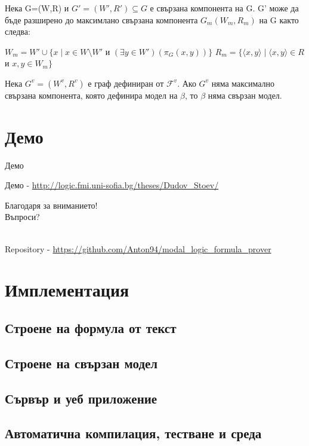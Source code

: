 \documentclass[14pt, aspectratio=169]{beamer}
\newcommand\F{\mathcal{F}}
\newcommand{\pair}[2]{ \langle #1, #2 \rangle }
\newcommand{\pairXY}{ \pair{x}{y} }
\begin{document}
\begin{frame}
	\begin{lemma}
		Нека G=(W,R) и $G'=(W', R') \subseteq G$ е свързана компонента на G.
		G' може да бъде разширено до максимлано свързана компонента $G_m(W_m, R_m)$  на G  както следва:
		\begin{center}
			 $W_m = W' \cup \{ x \mid x \in W \setminus W'$ и $(\exists y \in W')(\pi_G(x,y)) \}$
			 $R_m = \{ \pairXY \mid \pairXY \in R$ и $x, y \in W_m \}$
		\end{center}
	\end{lemma}

	\begin{theorem}
		Нека $G^v=(W^v, R^v)$ е граф дефиниран от $\F^v$. Ако $G^v$ няма максимално свързана компонента, която дефинира модел на $\beta$, то $\beta$ няма свързан модел.
	\end{theorem}
\end{frame}

\section{Демо}

\begin{frame}{Демо}
	\begin{center}
		Демо - \url{http://logic.fmi.uni-sofia.bg/theses/Dudov_Stoev/}
	\end{center}
\end{frame}

\begin{frame}
	\begin{center}
		\Huge
		Благодаря за вниманието!
		\\ [12mm]
		Въпроси?
	\end{center}

    \mbox{}
    \\ [20mm]
	\small
	Repository - \url{https://github.com/Anton94/modal_logic_formula_prover}
\end{frame}

\section{Имплементация}
\subsection{Строене на формула от текст}
\subsection{Строене на свързан модел}
\subsection{Сървър и уеб приложение}
\subsection{Автоматична компилация, тестване и среда}
\end{document}
